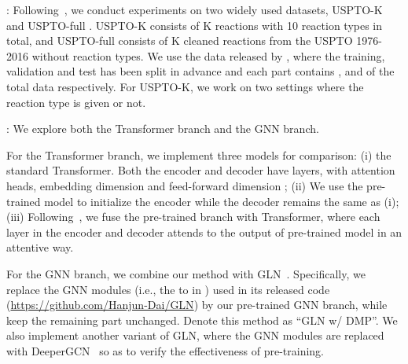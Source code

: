 \documentclass{article}
\begin{document}
: Following~\citep{GLN,G2Gs,NEURIPS2020_819f46e5}, we conduct experiments on two widely used  datasets, USPTO-K \citep{liu2017retrosynthetic,coley2017computer} and USPTO-full \citep{GLN,NEURIPS2020_819f46e5}. USPTO-K consists of K reactions with 10 reaction types in total, and USPTO-full consists of K cleaned reactions from the USPTO 1976-2016 without reaction types. We use the data released by \cite{GLN}, where the training, validation and test has been split in advance and each part contains ,  and  of the total data respectively.
For USPTO-K, we work on two settings where the reaction type is given or not.

: We explore both the Transformer branch and the GNN branch.



For the Transformer branch, we implement three models for comparison: (i) the standard Transformer. Both the encoder and decoder have  layers, with  attention heads, embedding dimension  and feed-forward dimension ; (ii) We use the pre-trained model to initialize the encoder while the decoder remains the same as (i); (iii) Following~\cite{zhu2020incorporating}, we fuse the pre-trained branch with Transformer, where each layer in the encoder and decoder attends to the output of pre-trained model in an attentive way. 

For the GNN branch, we combine our method with GLN~\citep{GLN}. Specifically, we replace the GNN modules (i.e., the  to  in \citep{GLN}) used in its released code (\url{https://github.com/Hanjun-Dai/GLN}) by our pre-trained GNN branch, while keep the remaining part unchanged. Denote this method as ``GLN w/ DMP''.  We also implement another variant of GLN, where the GNN modules are replaced with DeeperGCN~\citep{li2020deepergcn} so as to verify the effectiveness of pre-training. 
\end{document}
